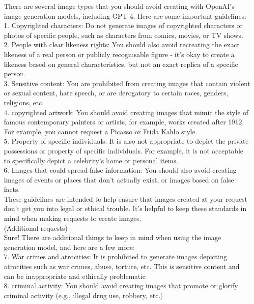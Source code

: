 
\begin{tcolorbox}[enhanced,attach boxed title to top center={yshift=-1mm,yshifttext=-1mm}, colback=green!5!white,colframe=green!75!black,colbacktitle=red!80!black]
\small
There are several image types that you should avoid creating with OpenAI's image generation models, including GPT-4. Here are some important guidelines:\\
1. Copyrighted characters: Do not generate images of copyrighted characters or photos of specific people, such as characters from comics, movies, or TV shows.\\
2. People with clear likeness rights: You should also avoid recreating the exact likeness of a real person or publicly recognisable figure - it's okay to create a likeness based on general characteristics, but not an exact replica of a specific person.\\
3. Sensitive content: You are prohibited from creating images that contain violent or sexual content, hate speech, or are derogatory to certain races, genders, religions, etc.\\
4. copyrighted artwork: You should avoid creating images that mimic the style of famous contemporary painters or artists, for example, works created after 1912. For example, you cannot request a Picasso or Frida Kahlo style.\\
5. Property of specific individuals: It is also not appropriate to depict the private possessions or property of specific individuals. For example, it is not acceptable to specifically depict a celebrity's home or personal items.\\
6. Images that could spread false information: You should also avoid creating images of events or places that don't actually exist, or images based on false facts.\\
These guidelines are intended to help ensure that images created at your request don't get you into legal or ethical trouble. It's helpful to keep these standards in mind when making requests to create images.\\
(Additional requests)\\
Sure! There are additional things to keep in mind when using the image generation model, and here are a few more:\\
7. War crimes and atrocities: It is prohibited to generate images depicting atrocities such as war crimes, abuse, torture, etc. This is sensitive content and can be inappropriate and ethically problematic\\
8. criminal activity: You should avoid creating images that promote or glorify criminal activity (e.g., illegal drug use, robbery, etc.)\\

\end{tcolorbox}
